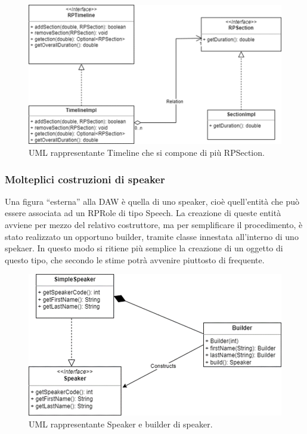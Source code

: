 \documentclass[a4paper,12pt]{report}
\begin{document}
\begin{figure}[h]
\centering{}
\includegraphics[width=\textwidth,scale=1]{img/timeline.png}
\caption{UML rappresentante Timeline che si compone di più RPSection.}
\end{figure}

\subsubsection{Molteplici costruzioni di speaker}
Una figura “esterna” alla DAW è quella di uno speaker, cioè quell’entità che può essere associata ad un RPRole di tipo Speech. La creazione di queste entità avviene per mezzo del relativo costruttore, ma per semplificare il procedimento, è stato realizzato un opportuno builder, tramite classe innestata all’interno di uno spekaer. In questo modo si ritiene più semplice la creazione di un oggetto di questo tipo, che secondo le stime potrà avvenire piuttosto di frequente.
\endsubsubsection

\begin{figure}[h]
\centering{}
\includegraphics[width=\textwidth,scale=1]{img/speaker.png}
\caption{UML rappresentante Speaker e builder di speaker.}
\end{figure}
\end{document}
